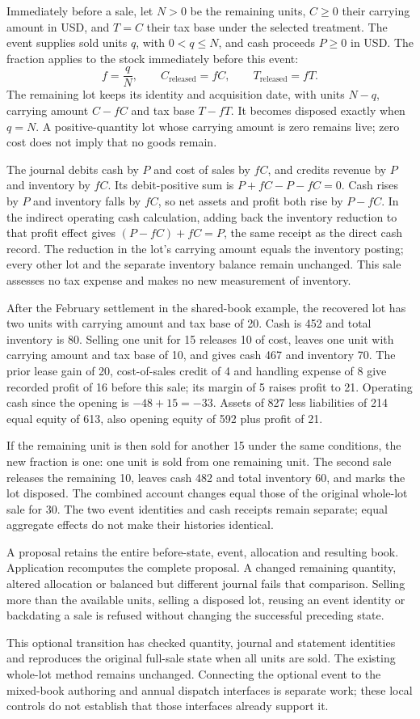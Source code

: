 Immediately before a sale, let $N>0$ be the remaining units, $C\geq0$ their
carrying amount in USD, and $T=C$ their tax base under the selected treatment.
The event supplies sold units $q$, with $0<q\leq N$, and cash proceeds $P\geq0$
in USD. The fraction applies to the stock immediately before this event:
\[
 f=\frac{q}{N},\qquad
 C_{\mathrm{released}}=fC,\qquad
 T_{\mathrm{released}}=fT.
\]
The remaining lot keeps its identity and acquisition date, with units $N-q$,
carrying amount $C-fC$ and tax base $T-fT$. It becomes disposed exactly when
$q=N$. A positive-quantity lot whose carrying amount is zero remains live;
zero cost does not imply that no goods remain.

The journal debits cash by $P$ and cost of sales by $fC$, and credits revenue
by $P$ and inventory by $fC$. Its debit-positive sum is
$P+fC-P-fC=0$. Cash rises by $P$ and inventory falls by $fC$, so net assets and
profit both rise by $P-fC$. In the indirect operating cash calculation, adding
back the inventory reduction to that profit effect gives
$(P-fC)+fC=P$, the same receipt as the direct cash record. The reduction in
the lot's carrying amount equals the inventory posting; every other lot and
the separate inventory balance remain unchanged. This sale assesses no tax
expense and makes no new measurement of inventory.

After the February settlement in the shared-book example, the recovered lot
has two units with carrying amount and tax base of 20. Cash is 452 and total
inventory is 80. Selling one unit for 15 releases 10 of cost, leaves one unit
with carrying amount and tax base of 10, and gives cash 467 and inventory 70.
The prior lease gain of 20, cost-of-sales credit of 4 and handling expense of 8
give recorded profit of 16 before this sale; its margin of 5 raises profit to
21. Operating cash since the opening is $-48+15=-33$. Assets of 827 less
liabilities of 214 equal equity of 613, also opening equity of 592 plus profit
of 21.

If the remaining unit is then sold for another 15 under the same conditions,
the new fraction is one: one unit is sold from one remaining unit. The second
sale releases the remaining 10, leaves cash 482 and total inventory 60, and
marks the lot disposed. The combined account changes equal those of the
original whole-lot sale for 30. The two event identities and cash receipts
remain separate; equal aggregate effects do not make their histories identical.

A proposal retains the entire before-state, event, allocation and resulting
book. Application recomputes the complete proposal. A changed remaining
quantity, altered allocation or balanced but different journal fails that
comparison. Selling more than the available units, selling a disposed lot,
reusing an event identity or backdating a sale is refused without changing
the successful preceding state.

This optional transition has checked quantity, journal and statement identities
and reproduces the original full-sale state when all units are sold. The
existing whole-lot method remains unchanged. Connecting the optional event to
the mixed-book authoring and annual dispatch interfaces is separate work;
these local controls do not establish that those interfaces already support it.
